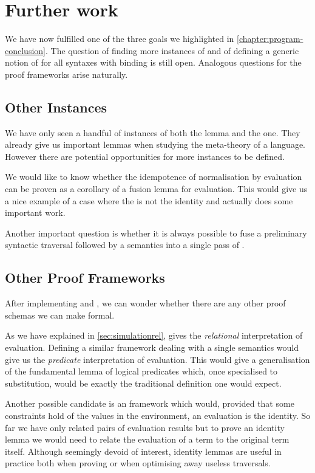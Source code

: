\section{Further work}

We have now fulfilled one of the three goals we highlighted in
\cref{chapter:program-conclusion}. The question of finding more instances of
 and of defining a generic notion of  for all
syntaxes with binding is still open. Analogous questions for the proof
frameworks arise naturally.


\subsection{Other Instances}

We have only seen a handful of instances of both the  lemma and
the  one. They already give us important lemmas when studying the
meta-theory of a language. However there are potential opportunities for more
instances to be defined.

We would like to know whether the idempotence of normalisation by evaluation
can be proven as a corollary of a fusion lemma for evaluation. This would give
us a nice example of a case where the  is not the identity and
actually does some important work.

Another important question is whether it is always possible to fuse a
preliminary syntactic traversal followed by a semantics  into
a single pass of .

\subsection{Other Proof Frameworks}

After implementing  and , we can wonder whether there
are any other proof schemas we can make formal.

As we have explained in \cref{sec:simulationrel},  gives the
\emph{relational} interpretation of evaluation. Defining a similar framework
dealing with a single semantics would give us the \emph{predicate} interpretation
of evaluation. This would give a generalisation of the fundamental lemma of logical
predicates which, once specialised to substitution, would be exactly the traditional
definition one would expect.

Another possible candidate is an  framework which would, provided that some
constraints hold of the values in the environment, an evaluation is the identity. So far
we have only related pairs of evaluation results but to prove an identity lemma we would
need to relate the evaluation of a term to the original term itself. Although seemingly
devoid of interest, identity lemmas are useful in practice both when proving or when
optimising away useless traversals.

